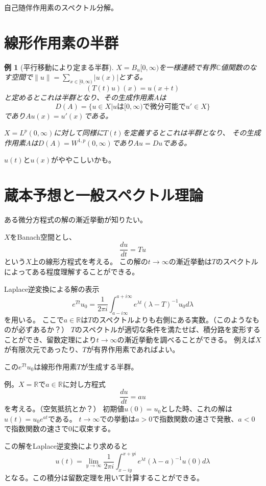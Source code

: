 \documentclass{jsarticle}
\newtheorem{eg}{例}
\newcommand{\C}{\mathbb{C}}
\newcommand{\R}{\mathbb{R}}
\newcommand{\abs}[1]{|#1|}
\newcommand{\norm}[1]{\|#1\|}
\begin{document}
自己随伴作用素のスペクトル分解。

\section{線形作用素の半群}
\begin{eg}[平行移動により定まる半群]
$X=B_u[0,\infty)$を一様連続で有界$\C$値関数のなす空間で$\norm{u}=\sum_{x\in[0,\infty)}\abs{u(x)}$とする。
\[
(T(t)u)(x)=u(x+t)
\]
と定めるとこれは半群となり、その生成作用素$A$は
\[
D(A)=\{u\in X\vert u\mbox{は}[0,\infty)\mbox{で微分可能で}u'\in X\}
\]
であり$Au(x)=u'(x)$である。

$X=L^p(0,\infty)$に対して同様に$T(t)$を定義するとこれは半群となり、
その生成作用素$A$は$D(A)=W^{1,p}(0,\infty)$であり$Au=Du$である。
\end{eg}
$u(t)$と$u(x)$がややこしいかも。

\section{蔵本予想と一般スペクトル理論}
ある微分方程式の解の漸近挙動が知りたい。

$X$をBanach空間とし、
\[
\frac{du}{dt}=Tu
\]
という$X$上の線形方程式を考える。
この解の$t\to \infty$の漸近挙動は$T$のスペクトルによってある程度理解することができる。

Laplace逆変換による解の表示
\[
e^{Tt}u_0=\frac{1}{2\pi i}\int^{a+i\infty}_{a-i\infty}e^{\lambda t}(\lambda-T)^{-1}u_0d\lambda
\]
を用いる。
ここで$a\in \R$は$T$のスペクトルよりも右側にある実数。（このようなものが必ずあるか？）
$T$のスペクトルが適切な条件を満たせば、積分路を変形することができ、留数定理により$t\to \infty$の漸近挙動を調べることができる。
例えば$X$が有限次元であったり、$T$が有界作用素であればよい。

この$e^{Tt}u_0$は線形作用素$T$が生成する半群。

例。$X=\R$で$a\in \R$に対し方程式
\[
\frac{du}{dt}=au
\]
を考える。（空気抵抗とか？）
初期値$u(0)=u_0$とした時、これの解は$u(t)=u_0e^{at}$である。
$t\to\infty$での挙動は$a>0$で指数関数の速さで発散、$a<0$で指数関数の速さで$0$に収束する。

この解をLaplace逆変換により求めると
\[
u(t)=\lim_{y\to\infty}\frac{1}{2\pi i}\int^{x+yi}_{x-iy}e^{\lambda t}(\lambda-a)^{-1}u(0)d\lambda
\]
となる。この積分は留数定理を用いて計算することができる。
\end{document}
